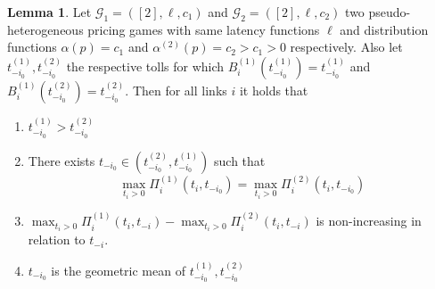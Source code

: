 \documentclass[10pt,a4paper]{book}
\newcommand{\Gm}{\mathcal{G}}
\theoremstyle{definition}
\newtheorem{lemma}[definition]{Lemma}
\theoremstyle{comment}
\begin{document}
\begin{lemma}
	\label{lemma:a_fixed_t_i0}
	Let $\Gm_1 = ([2], \ell, c_1)$ and $\Gm_2 = ([2], \ell, c_2)$ two pseudo-heterogeneous pricing games with same latency functions $\ell$ and distribution functions $\alpha(p) = c_1$ and $\alpha^{(2)}(p) = c_2 > c_1 > 0$ respectively.
	Also let $t_{-i_0}^{(1)}, t_{-i_0}^{(2)}$ the respective tolls for which $B_i^{(1)}(t_{-i_0}^{(1)}) = t_{-i_0}^{(1)}$ and $B_i^{(1)}(t_{-i_0}^{(2)}) = t_{-i_0}^{(2)}$.
	Then for all links $i$ it holds that
	\begin{enumerate}[$(i)$]
		\item $t_{-i_0}^{(1)} > t_{-i_0}^{(2)}$
		\item There exists $t_{-i_0} \in \left(t_{-i_0}^{(2)}, t_{-i_0}^{(1)}\right)$ such that
		\[\max_{t_i > 0}\Pi_i^{(1)}(t_i, t_{-i_0}) = \max_{t_i > 0}\Pi_i^{(2)}(t_i, t_{-i_0})\]
		\item $\max_{t_i > 0}\Pi_i^{(1)}(t_i, t_{-i}) - \max_{t_i > 0}\Pi_i^{(2)}(t_i, t_{-i})$ is non-increasing in relation to $t_{-i}$.
		\item $t_{-i_0}$ is the geometric mean of $t_{-i_0}^{(1)}, t_{-i_0}^{(2)}$
	\end{enumerate}
\end{lemma}
\end{document}
